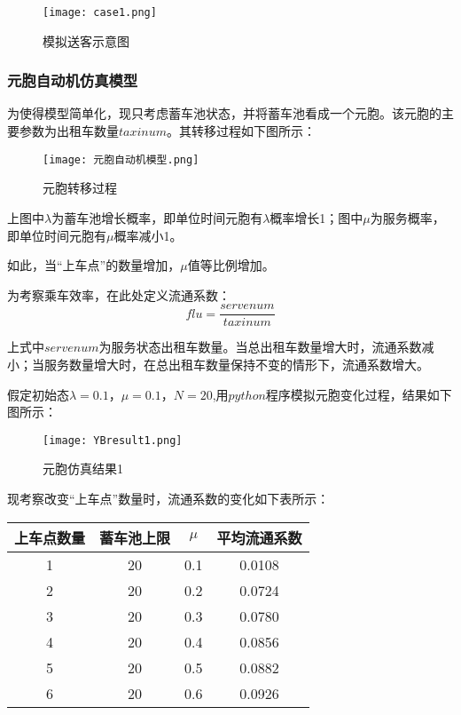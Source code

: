\documentclass[withoutpreface,bwprint]{cumcmthesis} %
\begin{document}
\begin{figure}[!h]
	\centering
	\texttt{[image: case1.png]}
	\caption{模拟送客示意图}
\end{figure}

\subsubsection{元胞自动机仿真模型}

为使得模型简单化，现只考虑蓄车池状态，并将蓄车池看成一个元胞。该元胞的主要参数为出租车数量$taxinum$。其转移过程如下图所示：
\begin{figure}[!h]
	\centering
	\texttt{[image: 元胞自动机模型.png]}
	\caption{元胞转移过程}
\end{figure}

上图中$\lambda$为蓄车池增长概率，即单位时间元胞有$\lambda$概率增长1；图中$\mu$为服务概率，即单位时间元胞有$\mu$概率减小1。

如此，当“上车点”的数量增加，$\mu$值等比例增加。

为考察乘车效率，在此处定义流通系数：
\begin{equation}
	flu=\frac{servenum}{taxinum}
\end{equation}

上式中$servenum$为服务状态出租车数量。当总出租车数量增大时，流通系数减小；当服务数量增大时，在总出租车数量保持不变的情形下，流通系数增大。

假定初始态$\lambda=0.1$，$\mu=0.1$，$N=20$,用$python$程序模拟元胞变化过程，结果如下图所示：
\begin{figure}[!h]
	\centering
	\texttt{[image: YBresult1.png]}
	\caption{元胞仿真结果1}
\end{figure}
\newpage

现考察改变“上车点”数量时，流通系数的变化如下表所示：
\begin{center}
	\begin{tabular}{cccc}
		\hline
		上车点数量 & 蓄车池上限 & $\mu$ & 平均流通系数 \\
		\hline
		1          & 20         & 0.1   & 0.0108       \\
		2          & 20         & 0.2   & 0.0724       \\
		3          & 20         & 0.3   & 0.0780       \\
		4          & 20         & 0.4   & 0.0856       \\
		5          & 20         & 0.5   & 0.0882       \\
		6          & 20         & 0.6   & 0.0926       \\
		\hline
	\end{tabular}
\end{center}
\end{document}
